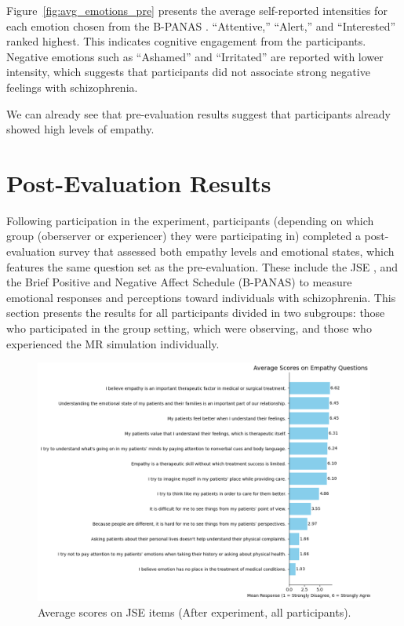 Figure~\ref{fig:avg_emotions_pre} presents the average self-reported intensities for each emotion chosen from the B-PANAS \cite{Boiroux2024}. “Attentive,” “Alert,” and “Interested” ranked highest. This indicates cognitive engagement from the participants. Negative emotions such as “Ashamed” and “Irritated” are reported with lower intensity, which suggests that participants did not associate strong negative feelings with schizophrenia. 

\vspace{1em}

We can already see that pre-evaluation results suggest that participants already showed high levels of empathy. 

\section{Post-Evaluation Results}

Following participation in the experiment, participants (depending on which group (oberserver or experiencer) they were participating in) completed a post-evaluation survey that assessed both empathy levels and emotional states, which features the same question set as the pre-evaluation. These include the JSE \cite{Hojat2002}, and the Brief Positive and Negative Affect Schedule (B-PANAS) \cite{Boiroux2024} to measure emotional responses and perceptions toward individuals with schizophrenia. This section presents the results for all participants divided in two subgroups: those who participated in the group setting, which were observing, and those who experienced the MR simulation individually.

\vspace{1em}

\begin{figure}[H]
\centering
\includegraphics[width=\columnwidth]{../../Figures/avg_scores_post_all.png}
\caption{Average scores on JSE items (After experiment, all participants).}
\label{fig:avg_scores_post_all}
\end{figure}

